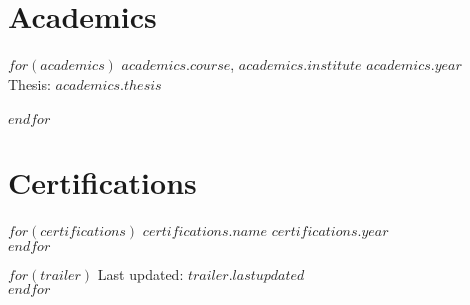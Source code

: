 \documentclass[$fontsize$, a4paper]{article}
\begin{document}
\section*{Academics}
$for(academics)$
  $academics.course$, \href{$academics.url$}{$academics.institute$} \hfill\emph{$academics.year$}\\
  Thesis: \href{$academics.thesis_url$}{$academics.thesis$}\\
  \\[.2cm]
$endfor$

\section*{Certifications}
$for(certifications)$
  \href{$certifications.url$}{$certifications.name$} \hfill\emph{$certifications.year$}\\
$endfor$

$for(trailer)$
  Last updated: $trailer.lastupdated$\\
$endfor$
\end{document}
